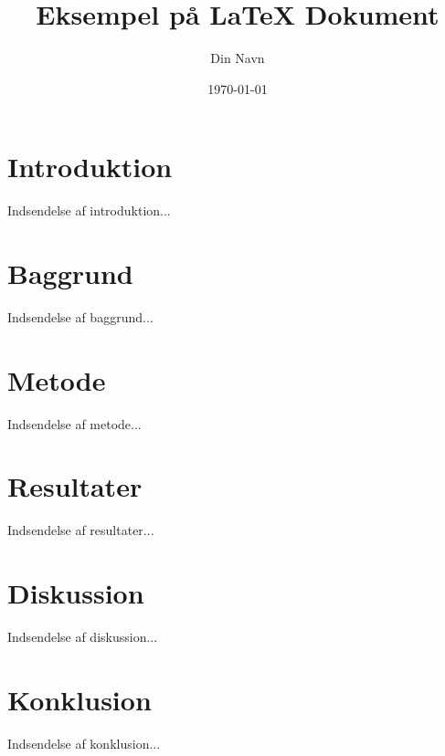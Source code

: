\documentclass[a4paper,12pt]{article}
\begin{document}
    \title{Eksempel på LaTeX Dokument}
    \author{Din Navn}
    \date{\today}
    \maketitle

    \tableofcontents
    \newpage

    \section{Introduktion}
    Indsendelse af introduktion...

    \section{Baggrund}
    Indsendelse af baggrund...
    \rightarrow{}

    \section{Metode}
    Indsendelse af metode...

    \section{Resultater}
    Indsendelse af resultater...

    \section{Diskussion}
    Indsendelse af diskussion...

    \section{Konklusion}
    Indsendelse af konklusion...
\end{document}
